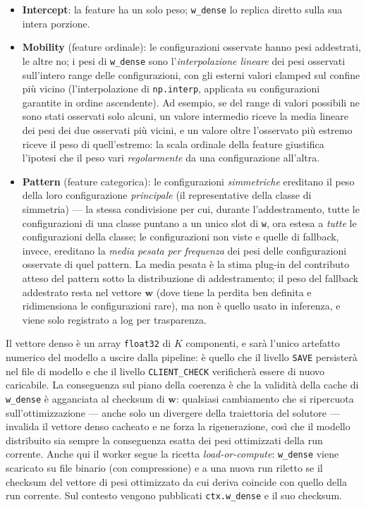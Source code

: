 \begin{itemize}
  \item \textbf{Intercept}: la feature ha un solo peso; \texttt{w\_dense} lo
    replica diretto sulla sua intera porzione.
  \item \textbf{Mobility} (feature ordinale): le configurazioni osservate
    hanno pesi addestrati, le altre no; i pesi di \texttt{w\_dense} sono
    l'\emph{interpolazione lineare} dei pesi osservati sull'intero range delle
    configurazioni, con gli esterni valori clamped sul confine più vicino
    (l'interpolazione di \texttt{np.interp}, applicata su configurazioni
    garantite in ordine ascendente). Ad esempio, se del range di valori
    possibili ne sono stati osservati solo alcuni, un valore intermedio riceve
    la media lineare dei pesi dei due osservati più vicini, e un valore oltre
    l'osservato più estremo riceve il peso di quell'estremo: la scala
    ordinale della feature giustifica l'ipotesi che il peso vari
    \emph{regolarmente} da una configurazione all'altra.
  \item \textbf{Pattern} (feature categorica): le configurazioni
    \emph{simmetriche} ereditano il peso della loro configurazione
    \emph{principale} (il representative della classe di simmetria) — la
    stessa condivisione per cui, durante l'addestramento, tutte le
    configurazioni di una classe puntano a un unico slot di \texttt{w}, ora
    estesa a \emph{tutte} le configurazioni della classe; le configurazioni
    non viste e quelle di fallback, invece, ereditano la \emph{media pesata
    per frequenza} dei pesi delle configurazioni osservate di quel pattern.
    La media pesata è la stima plug-in del contributo atteso del pattern
    sotto la distribuzione di addestramento; il peso del fallback addestrato
    resta nel vettore $\bm{w}$ (dove tiene la perdita ben definita e
    ridimensiona le configurazioni rare), ma non è quello usato in
    inferenza, e viene solo registrato a log per trasparenza.
\end{itemize}

Il vettore denso è un array \texttt{float32} di $K$ componenti, e sarà
l'unico artefatto numerico del modello a uscire dalla pipeline: è quello che
il livello \texttt{SAVE} persisterà nel file di modello e che il livello
\texttt{CLIENT\_CHECK} verificherà essere di nuovo caricabile. La
conseguenza sul piano della coerenza è che la validità della cache di
\texttt{w\_dense} è agganciata al checksum di $\bm{w}$: qualsiasi
cambiamento che si ripercuota sull'ottimizzazione — anche solo un
divergere della traiettoria del solutore — invalida il vettore denso
cacheato e ne forza la rigenerazione, così che il modello distribuito sia
sempre la conseguenza esatta dei pesi ottimizzati della run corrente. Anche qui il
worker segue la ricetta \emph{load-or-compute}: \texttt{w\_dense} viene
scaricato su file binario (con compressione) e a una nuova run riletto se il
checksum del vettore di pesi ottimizzato da cui deriva coincide con quello
della run corrente. Sul contesto vengono pubblicati \texttt{ctx.w\_dense} e il
suo checksum.

